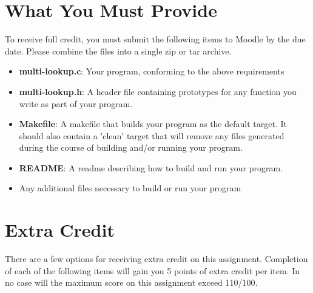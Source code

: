 \documentclass[12pt]{article}
\begin{document}
\section{What You Must Provide}
To receive full credit, you must submit the following items to Moodle
by the due date. Please combine the files into a single zip or tar
archive.

\begin{itemize}
\item {\bf multi-lookup.c}: Your program, conforming to the above
  requirements
\item {\bf multi-lookup.h}: A header file containing prototypes for any
  function you write as part of your program.
\item {\bf Makefile}: A makefile that builds your program as the
  default target. It should also contain a 'clean' target that will
  remove any files generated during the course of building and/or
  running your program.
\item {\bf README}: A readme describing how to build and run your
  program.
\item Any additional files necessary to build or run your program
\end{itemize}

\section{Extra Credit}

There are a few options for receiving extra credit on this
assignment. Completion of each of the following items will gain you 5
points of extra credit per item. In no case will the maximum score on
this assignment exceed 110/100.
\end{document}
